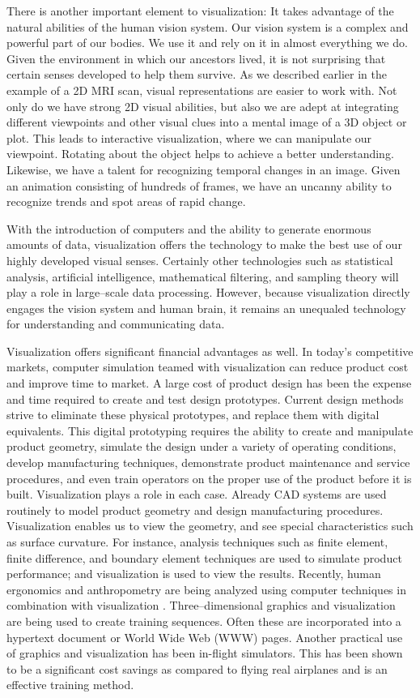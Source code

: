 There is another important element to visualization: It takes advantage of the natural abilities of the human vision system. Our vision system is a complex and powerful part of our bodies. We use it and rely on it in almost everything we do. Given the environment in which our ancestors lived, it is not surprising that certain senses developed to help them survive. As we described earlier in the example of a 2D MRI scan, visual representations are easier to work with. Not only do we have strong 2D visual abilities, but also we are adept at integrating different viewpoints and other visual clues into a mental image of a 3D object or plot. This leads to interactive visualization, where we can manipulate our viewpoint. Rotating about the object helps to achieve a better understanding. Likewise, we have a talent for recognizing temporal changes in an image. Given an animation consisting of hundreds of frames, we have an uncanny ability to recognize trends and spot areas of rapid change.

With the introduction of computers and the ability to generate enormous amounts of data, visualization offers the technology to make the best use of our highly developed visual senses. Certainly other technologies such as statistical analysis, artificial intelligence, mathematical filtering, and sampling theory will play a role in large--scale data processing. However, because visualization directly engages the vision system and human brain, it remains an unequaled technology for understanding and communicating data.

Visualization offers significant financial advantages as well. In today's competitive markets, computer simulation teamed with visualization can reduce product cost and improve time to market. A large cost of product design has been the expense and time required to create and test design prototypes. Current design methods strive to eliminate these physical prototypes, and replace them with digital equivalents. This digital prototyping requires the ability to create and manipulate product geometry, simulate the design under a variety of operating conditions, develop manufacturing techniques, demonstrate product maintenance and service procedures, and even train operators on the proper use of the product before it is built. Visualization plays a role in each case. Already CAD systems are used routinely to model product geometry and design manufacturing procedures. Visualization enables us to view the geometry, and see special characteristics such as surface curvature. For instance, analysis techniques such as finite element, finite difference, and boundary element techniques are used to simulate product performance; and visualization is used to view the results. Recently, human ergonomics and anthropometry are being analyzed using computer techniques in combination with visualization \cite{MDHMS}. Three--dimensional graphics and visualization are being used to create training sequences. Often these are incorporated into a hypertext document or World Wide Web (WWW) pages. Another practical use of graphics and visualization has been in-flight simulators. This has been shown to be a significant cost savings as compared to flying real airplanes and is an effective training method.

